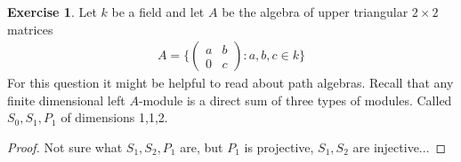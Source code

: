 \documentclass[12pt]{extarticle}
\newcommand{\set}[1]{\{#1\}}
\newcommand{\<}{\langle}
\renewcommand{\>}{\rangle}
\theoremstyle{definition}
\newtheorem{exercise}{Exercise}
\begin{document}
\begin{exercise}
  Let $k$ be a field and let $A$ be the algebra of upper triangular $2 \times 2$ matrices
  \begin{align*}
    A = \set{
      \begin{pmatrix}
        a & b \\
        0 & c
      \end{pmatrix}:
      a,b,c \in k
    }
  \end{align*}
  For this question it might be helpful to read about path algebras. Recall that any finite dimensional left $A$-module is a direct sum of three types of modules. Called $S_0, S_1, P_1$ of dimensions 1,1,2.
  
\end{exercise}
\begin{proof}
  Not sure what $S_1, S_2, P_1$ are, but $P_1$ is projective, $S_1,S_2$ are injective... 
\end{proof}
\end{document}
